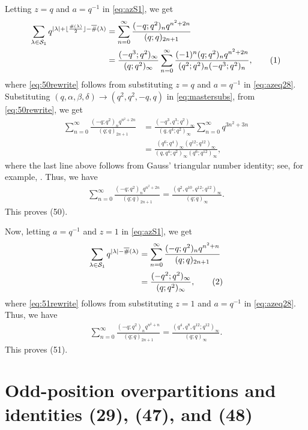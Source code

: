 \documentclass[11pt]{amsart}
\theoremstyle{definition}
\theoremstyle{remark}
\numberwithin{equation}{section}
\newcommand\numberthis{\addtocounter{equation}{1}\tag{\theequation}}
\begin{document}
Letting $z = q$ and $a = q^{-1}$ in \eqref{eq:azS1}, we get
\begin{align*}
\sum\limits_{\lambda\in\mathcal{S}_1}q^{|\lambda|+\lfloor\frac{\#(\lambda)}{2}\rfloor-\overline{\#}(\lambda)} &= \sum\limits_{n=0}^{\infty}\frac{(-q;q^2)_nq^{n^2+2n}}{(q;q)_{2n+1}}\\
&= \frac{(-q^3;q^2)_{\infty}}{(q;q^2)_{\infty}}\sum\limits_{n=0}^{\infty}\frac{(-1)^n(q;q^2)_nq^{n^2+2n}}{(q^2;q^2)_n(-q^3;q^2)_n},\numberthis\label{eq:50rewrite}
\end{align*}
where \eqref{eq:50rewrite} follows from substituting $z = q$ and $a = q^{-1}$ in \eqref{eq:azeq28}. Substituting $(q,\alpha,\beta,\delta)\rightarrow (q^2,q^2,-q,q)$ in \eqref{eq:mastersubs}, from \eqref{eq:50rewrite}, we get
\begin{align*}
\sum\limits_{n=0}^{\infty}\frac{(-q;q^2)_nq^{n^2+2n}}{(q;q)_{2n+1}} &= \frac{(-q^3,q^3;q^2)_{\infty}}{(q,q^4;q^2)_{\infty}}\sum\limits_{n=0}^{\infty}q^{3n^2+3n}\\
&= \frac{(q^6;q^4)_{\infty}(q^{12};q^{12})_{\infty}}{(q,q^4;q^2)_{\infty}(q^6;q^{12})_{\infty}},
\end{align*}
where the last line above follows from Gauss' triangular number identity; see, for example, \cite{A}. Thus, we have
\begin{align*}
\sum\limits_{n=0}^{\infty}\frac{(-q;q^2)_nq^{n^2+2n}}{(q;q)_{2n+1}} = \frac{(q^2,q^{10},q^{12};q^{12})_{\infty}}{(q;q)_{\infty}}.
\end{align*}
This proves (50).

Now, letting $a = q^{-1}$ and $z = 1$ in \eqref{eq:azS1}, we get
\begin{align*}
\sum\limits_{\lambda\in\mathcal{S}_1}q^{|\lambda|-\overline{\#}(\lambda)} &= \sum\limits_{n=0}^{\infty}\frac{(-q;q^2)_nq^{n^2+n}}{(q;q)_{2n+1}}\\
&= \frac{(-q^2;q^2)_{\infty}}{(q;q^2)_{\infty}},\numberthis\label{eq:51rewrite}
\end{align*}
where \eqref{eq:51rewrite} follows from substituting $z = 1$ and $a = q^{-1}$ in \eqref{eq:azeq28}. Thus, we have
\begin{align*}
\sum\limits_{n=0}^{\infty}\frac{(-q;q^2)_nq^{n^2+n}}{(q;q)_{2n+1}} = \frac{(q^4,q^8,q^{12};q^{12})_{\infty}}{(q;q)_{\infty}}.
\end{align*}
This proves (51).


\section{Odd-position overpartitions and identities (29), (47), and (48)}\label{sec:S2}
\end{document}
